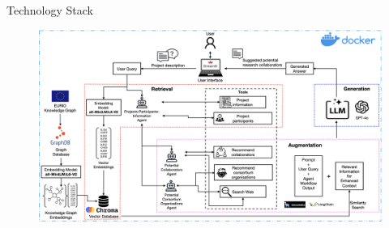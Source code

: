 \begin{frame}{Technology Stack}
    \begin{figure}
        \centering
        \includegraphics[width=\textwidth]{../img/implementation/proposed-system-graphRAG-technologies.png}
    \end{figure}
\end{frame}